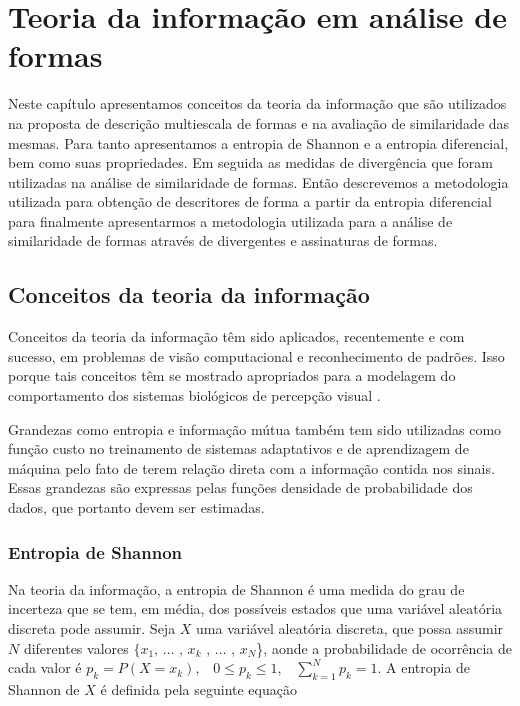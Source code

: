 
\chapter{Teoria da informação em análise de formas \label{chap:TINFO}}

Neste capítulo apresentamos conceitos da teoria da informação que são utilizados na proposta de descrição multiescala de formas e na avaliação de similaridade das mesmas.
Para tanto apresentamos a entropia de Shannon e a entropia diferencial, bem como suas propriedades. Em seguida as medidas de divergência que foram utilizadas na análise de similaridade de formas. Então descrevemos a metodologia utilizada para obtenção de descritores de forma a partir da entropia diferencial para finalmente apresentarmos a metodologia utilizada para a análise de similaridade de formas através de divergentes e assinaturas de formas.

\section{Conceitos da teoria da informação}

Conceitos da teoria da informação têm sido aplicados, recentemente e com sucesso, em problemas de visão computacional e reconhecimento de padrões. Isso porque tais conceitos têm se mostrado apropriados para a modelagem do comportamento dos sistemas biológicos de percepção visual \cite{Escolano:2009}.

Grandezas como entropia e informação mútua também tem sido utilizadas como função custo no treinamento de sistemas adaptativos e de aprendizagem de máquina \cite{Principe:2011} pelo fato de terem relação direta com a informação contida nos sinais. Essas grandezas são expressas pelas funções densidade de probabilidade dos dados, que portanto devem ser estimadas. 

\subsection{Entropia de Shannon}

Na teoria da informação, a entropia de Shannon é uma medida do grau de incerteza que se tem, em média, dos possíveis estados que uma variável aleatória discreta pode assumir. Seja  $X$ uma variável aleatória discreta, que possa assumir $N$ diferentes valores $\{x_1\text{, } \ldots\text{ , }x_k\text{ , }\ldots\text{ , }x_N$\}, aonde a probabilidade de ocorrência de cada valor é $p_k = P(X = x_k) \text{,} \quad 0 \leq p_k \leq 1 \text{,} \quad \sum \limits_{k=1}^N p_k = 1$. A entropia de Shannon de $X$ é definida pela seguinte equação 

